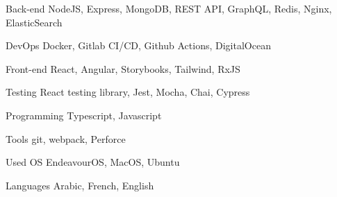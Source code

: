 

\begin{cvskills}

  \cvskill
    {Back-end} %
    {NodeJS, Express, MongoDB, REST API, GraphQL, Redis, Nginx, ElasticSearch} %

  \cvskill
    {DevOps} %
    {Docker, Gitlab CI/CD, Github Actions, DigitalOcean} %

  \cvskill
    {Front-end} %
    {React, Angular, Storybooks, Tailwind, RxJS} %

  \cvskill
    {Testing} %
    {React testing library, Jest, Mocha, Chai, Cypress} %

  \cvskill
    {Programming} %
    {Typescript, Javascript} %

  \cvskill
    {Tools} %
    {git, webpack, Perforce} %

  \cvskill
    {Used OS} %
    {EndeavourOS, MacOS, Ubuntu} %

  \cvskill
    {Languages} %
    {Arabic, French, English} %

\end{cvskills}
